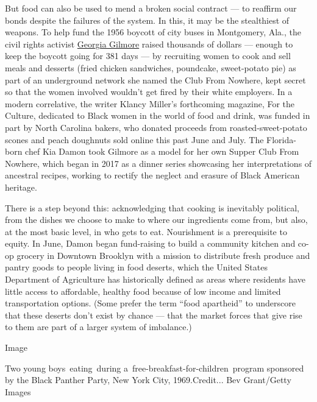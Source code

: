 But food can also be used to mend a broken social contract --- to
reaffirm our bonds despite the failures of the system. In this, it may
be the stealthiest of weapons. To help fund the 1956 boycott of city
buses in Montgomery, Ala., the civil rights activist
\href{https://www.nytimes3xbfgragh.onion/2019/07/31/obituaries/georgia-gilmore-overlooked.html}{Georgia
Gilmore} raised thousands of dollars --- enough to keep the boycott
going for 381 days --- by recruiting women to cook and sell meals and
desserts (fried chicken sandwiches, poundcake, sweet-potato pie) as part
of an underground network she named the Club From Nowhere, kept secret
so that the women involved wouldn't get fired by their white employers.
In a modern correlative, the writer Klancy Miller's forthcoming
magazine, For the Culture, dedicated to Black women in the world of food
and drink, was funded in part by North Carolina bakers, who donated
proceeds from roasted-sweet-potato scones and peach doughnuts sold
online this past June and July. The Florida-born chef Kia Damon took
Gilmore as a model for her own Supper Club From Nowhere, which began in
2017 as a dinner series showcasing her interpretations of ancestral
recipes, working to rectify the neglect and erasure of Black American
heritage.

There is a step beyond this: acknowledging that cooking is inevitably
political, from the dishes we choose to make to where our ingredients
come from, but also, at the most basic level, in who gets to eat.
Nourishment is a prerequisite to equity. In June, Damon began
fund-raising to build a community kitchen and co-op grocery in Downtown
Brooklyn with a mission to distribute fresh produce and pantry goods to
people living in food deserts, which the United States Department of
Agriculture has historically defined as areas where residents have
little access to affordable, healthy food because of low income and
limited transportation options. (Some prefer the term ``food apartheid''
to underscore that these deserts don't exist by chance --- that the
market forces that give rise to them are part of a larger system of
imbalance.)

Image

Two young boys~eating~during a~free-breakfast-for-children~program
sponsored by the Black Panther Party, New York City, 1969.Credit... Bev
Grant/Getty Images

